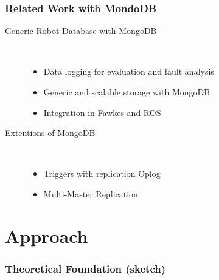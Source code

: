 \begin{frame}
  \frametitle{Related Work with MondoDB}
  \begin{description}
  \item[Generic Robot Database with MongoDB~\cite{RoboDB}]%
                \hfill \\
    \begin{itemize}
    \item Data logging for evaluation and fault analysis
    \item Generic and scalable storage with MongoDB
    \item Integration in Fawkes and ROS
    \end{itemize}
\bigskip
  \item[Extentions of  MongoDB]%
                \hfill \\
    \begin{itemize}
    \item Triggers with replication Oplog~\cite{mongodb-trigger}
    \item Multi-Master Replication~\cite{mongodb-multi-master}
    \end{itemize}
  \end{description}
\end{frame}


\section{Approach}
\begin{frame}
  \frametitle{Theoretical Foundation (sketch)}
\end{frame}

